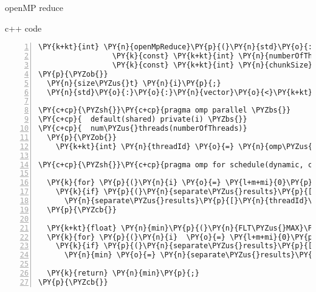 \documentclass{beamer}
\begin{document}
\begin{frame}[fragile]{openMP reduce}

\begin{block}{c++ code}

\tiny
\begin{Verbatim}[commandchars=\\\{\},numbers=left,firstnumber=1,stepnumber=1]
\PY{k+kt}{int} \PY{n}{openMpReduce}\PY{p}{(}\PY{n}{std}\PY{o}{:}\PY{o}{:}\PY{n}{vector}\PY{o}{<}\PY{k+kt}{float}\PY{o}{>}\PY{o}{&} \PY{n}{data}\PY{p}{,}
                 \PY{k}{const} \PY{k+kt}{int} \PY{n}{numberOfThreads}\PY{p}{,}
                 \PY{k}{const} \PY{k+kt}{int} \PY{n}{chunkSize}\PY{p}{)}
\PY{p}{\PYZob{}}
  \PY{n}{size\PYZus{}t} \PY{n}{i}\PY{p}{;}
  \PY{n}{std}\PY{o}{:}\PY{o}{:}\PY{n}{vector}\PY{o}{<}\PY{k+kt}{float}\PY{o}{>} \PY{n}{separate\PYZus{}results}\PY{p}{(}\PY{n}{numberOfThreads}\PY{p}{,} \PY{n}{FLT\PYZus{}MAX}\PY{p}{)}\PY{p}{;}

\PY{c+cp}{\PYZsh{}}\PY{c+cp}{pragma omp parallel \PYZbs{}}
\PY{c+cp}{  default(shared) private(i) \PYZbs{}}
\PY{c+cp}{  num\PYZus{}threads(numberOfThreads)}
  \PY{p}{\PYZob{}}
    \PY{k+kt}{int} \PY{n}{threadId} \PY{o}{=} \PY{n}{omp\PYZus{}get\PYZus{}thread\PYZus{}num}\PY{p}{(}\PY{p}{)}\PY{p}{;}

\PY{c+cp}{\PYZsh{}}\PY{c+cp}{pragma omp for schedule(dynamic, chunkSize)}

  \PY{k}{for} \PY{p}{(}\PY{n}{i} \PY{o}{=} \PY{l+m+mi}{0}\PY{p}{;} \PY{n}{i} \PY{o}{<} \PY{n}{data}\PY{p}{.}\PY{n}{size}\PY{p}{(}\PY{p}{)}\PY{p}{;} \PY{n}{i}\PY{o}{+}\PY{o}{+}\PY{p}{)}
    \PY{k}{if} \PY{p}{(}\PY{n}{separate\PYZus{}results}\PY{p}{[}\PY{n}{threadId}\PY{p}{]} \PY{o}{<} \PY{n}{data}\PY{p}{[}\PY{n}{i}\PY{p}{]}\PY{p}{)}
      \PY{n}{separate\PYZus{}results}\PY{p}{[}\PY{n}{threadId}\PY{p}{]} \PY{o}{=} \PY{n}{data}\PY{p}{[}\PY{n}{i}\PY{p}{]}\PY{p}{;}
  \PY{p}{\PYZcb{}}

  \PY{k+kt}{float} \PY{n}{min}\PY{p}{(}\PY{n}{FLT\PYZus{}MAX}\PY{p}{)}\PY{p}{;}
  \PY{k}{for} \PY{p}{(}\PY{n}{i}  \PY{o}{=} \PY{l+m+mi}{0}\PY{p}{;} \PY{n}{i} \PY{o}{<} \PY{n}{numberOfThreads}\PY{p}{;} \PY{n}{i}\PY{o}{+}\PY{o}{+}\PY{p}{)}
    \PY{k}{if} \PY{p}{(}\PY{n}{separate\PYZus{}results}\PY{p}{[}\PY{n}{i}\PY{p}{]} \PY{o}{<} \PY{n}{min}\PY{p}{)}
      \PY{n}{min} \PY{o}{=} \PY{n}{separate\PYZus{}results}\PY{p}{[}\PY{n}{i}\PY{p}{]}\PY{p}{;}

  \PY{k}{return} \PY{n}{min}\PY{p}{;}
\PY{p}{\PYZcb{}}
\end{Verbatim}


\end{block}

\end{frame}
\end{document}
